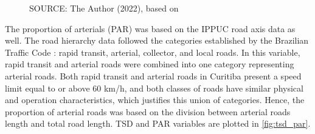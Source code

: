 \begin{figure}[!htbp]
\begin{subfigure}{0.5\textwidth}
    \end{subfigure}
    \label{fig:dis_dsc}
    \par SOURCE: The Author (2022), based on \textcite{IPPUC2018b,IPPUC2021,SETRAN2020}
\end{figure}

The proportion of arterials (PAR) was based on the IPPUC road axis data as well. The road hierarchy data followed the categories established by the Brazilian Traffic Code \cite{Brasil1997}: rapid transit, arterial, collector, and local roads. In this variable, rapid transit and arterial roads were combined into one category representing arterial roads. Both rapid transit and arterial roads in Curitiba present a speed limit equal to or above 60 km/h, and both classes of roads have similar physical and operation characteristics, which justifies this union of categories. Hence, the proportion of arterial roads was based on the division between arterial roads length and total road length. TSD and PAR variables are plotted in \autoref{fig:tsd_par}.

